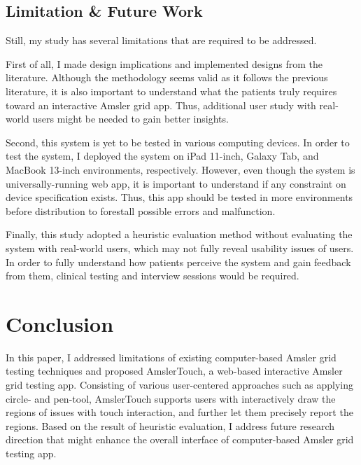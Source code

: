 \subsection{Limitation \& Future Work}

Still, my study has several limitations that are required to be addressed.

First of all, I made design implications and implemented designs from the literature. Although the methodology seems valid as it follows the previous literature, it is also important to understand what the patients truly requires toward an interactive Amsler grid app. Thus, additional user study with real-world users might be needed to gain better insights.

Second, this system is yet to be tested in various computing devices. In order to test the system, I deployed the system on iPad 11-inch, Galaxy Tab, and MacBook 13-inch environments, respectively. However, even though the system is universally-running web app, it is important to understand if any constraint on device specification exists. Thus, this app should be tested in more environments before distribution to forestall possible errors and malfunction.

Finally, this study adopted a heuristic evaluation method without evaluating the system with real-world users, which may not fully reveal usability issues of users. In order to fully understand how patients perceive the system and gain feedback from them, clinical testing and interview sessions would be required.

\section{Conclusion}

In this paper, I addressed limitations of existing computer-based Amsler grid testing techniques and proposed AmslerTouch, a web-based interactive Amsler grid testing app. Consisting of various user-centered approaches such as applying circle- and pen-tool, AmslerTouch supports users with interactively draw the regions of issues with touch interaction, and further let them precisely report the regions. Based on the result of heuristic evaluation, I address future research direction that might enhance the overall interface of computer-based Amsler grid testing app.